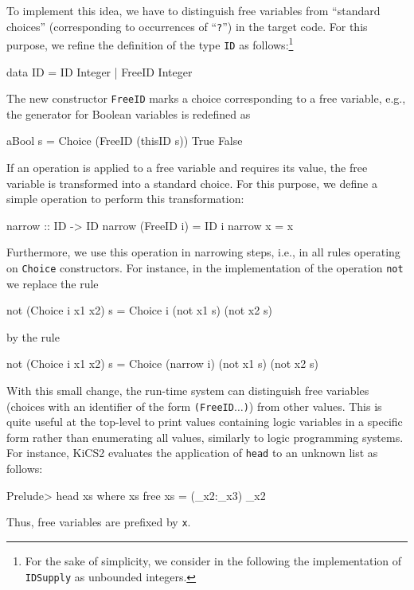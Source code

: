 \documentclass{llncs}
\newcommand{\code}[1]{\mbox{\small\texttt{#1}}}
\newcommand{\ccode}[1]{``\code{#1}''}
\newcommand{\us}{\char95\xspace} %
\begin{document}
To implement this idea, we have to distinguish free variables
from ``standard choices'' (corresponding to occurrences of \ccode{?})
in the target code. For this purpose, we refine the definition
of the type \code{ID} as follows:\footnote{For the sake
of simplicity, we consider in the following the
implementation of \code{IDSupply} as unbounded integers.}
\begin{haskell}
  data ID = ID Integer | FreeID Integer
\end{haskell}
The new constructor \code{FreeID} marks a choice corresponding to
a free variable, e.g., the generator for Boolean variables is
redefined as
\begin{haskell}
  aBool s = Choice (FreeID (thisID s)) True False
\end{haskell}
%
If an operation is applied to a free variable and requires its value,
the free variable is transformed into a standard choice.
For this purpose, we define a simple operation to perform
this transformation:
\begin{haskell}
  narrow :: ID -> ID
  narrow (FreeID i) = ID i
  narrow x          = x
\end{haskell}
Furthermore, we use this operation in narrowing steps,
i.e., in all rules operating on \code{Choice} constructors.
For instance, in the implementation of the operation \code{not}
we replace the rule
\begin{haskell}
  not (Choice i x1 x2) s = Choice i (not x1 s) (not x2 s)
\end{haskell}
by the rule
\begin{haskell}
  not (Choice i x1 x2) s = Choice (narrow i) (not x1 s) (not x2 s)
\end{haskell}
With this small change, the run-time system can distinguish
free variables (choices with an identifier of the form \code{(FreeID$\ldots$)})
from other values. This is quite useful at the top-level
to print values containing logic variables in a specific form
rather than enumerating all values, similarly to logic programming systems.
For instance, KiCS2 evaluates the application of \code{head}
to an unknown list as follows:
\begin{haskell}
  Prelude> head xs where xs free
  {xs = (_x2:_x3)} _x2
\end{haskell}
Thus, free variables are prefixed by \code{\us{}x}.
\end{document}
